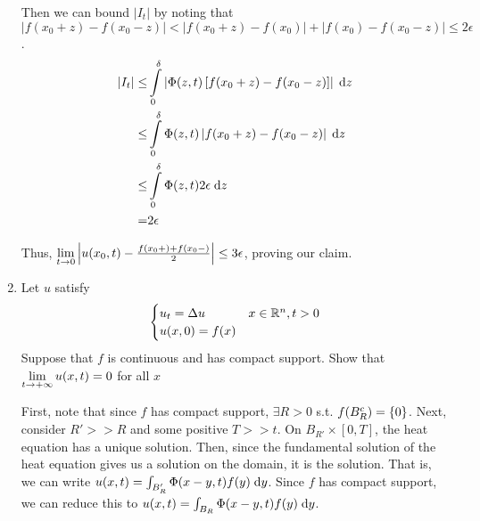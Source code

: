 \begin{enumerate}
  Then we can bound $|I_t|$ by noting that $|f(x_0 + z) - f(x_0 - z)| < |f(x_0 + z) - f(x_0)| + |f(x_0) - f(x_0 - z)| \leq 2 \epsilon$.
  \begin{align*}
  |I_t| \leq &\int \limits_{0}^{\delta} \left| \Phi(z, t) \left[ f(x_0 + z) - f(x_0 - z) \right] \right| \;\mathrm{d}z\\
        \leq &\int \limits_{0}^{\delta} \Phi(z, t) \left| f(x_0 + z) - f(x_0 - z) \right| \;\mathrm{d}z\\
        \leq &\int \limits_{0}^{\delta} \Phi(z, t) 2 \epsilon \;\mathrm{d}z\\
        = & 2 \epsilon\\
  \end{align*}

  Thus, $\lim \limits_{t \rightarrow 0} \left|u(x_0, t) - \frac{f(x_0+) + f(x_0-)}{2}\right| \leq 3 \epsilon$,
  proving our claim.

\item
  Let $u$ satisfy
  $$
  \begin{cases}
    u_t = \Delta u & x \in \mathbb{R}^n, t > 0\\
    u(x, 0) = f(x)
  \end{cases}
  $$
  Suppose that $f$ is continuous and has compact support.
  Show that $\lim \limits_{t \rightarrow +\infty} u(x, t) = 0$ for all $x$

  First, note that since $f$ has compact support, $\exists R > 0$ s.t.
  $f(B_R^c) = \{ 0 \}$.
  Next, consider $R' >> R$ and some positive $T >> t$.
  On $B_{R'} \times [0, T]$, the heat equation has a unique solution.
  Then, since the fundamental solution of the heat equation gives us a solution on the domain, it is the solution.
  That is, we can write $u(x, t) = \int_{B_R'} \Phi(x - y, t) f(y) \;\mathrm{d}y$.
  Since $f$ has compact support, we can reduce this to $u(x, t) = \int_{B_R} \Phi(x - y, t) f(y) \;\mathrm{d}y$.
\end{enumerate}
